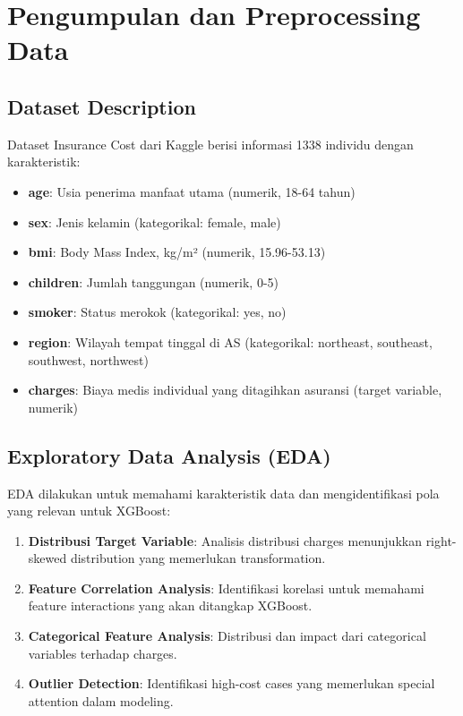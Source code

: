 \section{Pengumpulan dan Preprocessing Data}

\subsection{Dataset Description}
Dataset Insurance Cost dari Kaggle berisi informasi 1338 individu dengan karakteristik:
\begin{itemize}
    \item \textbf{age}: Usia penerima manfaat utama (numerik, 18-64 tahun)
    \item \textbf{sex}: Jenis kelamin (kategorikal: female, male)
    \item \textbf{bmi}: Body Mass Index, kg/m² (numerik, 15.96-53.13)
    \item \textbf{children}: Jumlah tanggungan (numerik, 0-5)
    \item \textbf{smoker}: Status merokok (kategorikal: yes, no)
    \item \textbf{region}: Wilayah tempat tinggal di AS (kategorikal: northeast, southeast, southwest, northwest)
    \item \textbf{charges}: Biaya medis individual yang ditagihkan asuransi (target variable, numerik)
\end{itemize}

\subsection{Exploratory Data Analysis (EDA)}
EDA dilakukan untuk memahami karakteristik data dan mengidentifikasi pola yang relevan untuk XGBoost:
\begin{enumerate}
    \item \textbf{Distribusi Target Variable}: Analisis distribusi charges menunjukkan right-skewed distribution yang memerlukan transformation.
    \item \textbf{Feature Correlation Analysis}: Identifikasi korelasi untuk memahami feature interactions yang akan ditangkap XGBoost.
    \item \textbf{Categorical Feature Analysis}: Distribusi dan impact dari categorical variables terhadap charges.
    \item \textbf{Outlier Detection}: Identifikasi high-cost cases yang memerlukan special attention dalam modeling.
\end{enumerate}

